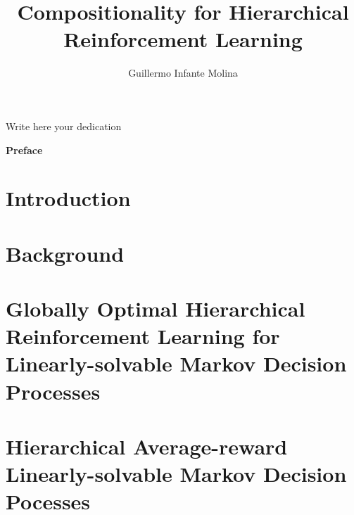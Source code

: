 \documentclass[12pt, a4paper,twoside]{tesi_upf}
\title{Compositionality for Hierarchical Reinforcement Learning}
\subtitle{}
\author{Guillermo Infante Molina}
\begin{document}
\frontmatter

\maketitle

\cleardoublepage



\noindent Write here your dedication

\cleardoublepage




\cleardoublepage


% 

\cleardoublepage

{\bf Preface}

\cleardoublepage


\tableofcontents

\listoffigures

\listoftables

\setlength{\parskip}{0.5\baselineskip}
\setlength{\parindent}{0pt}
\raggedbottom
\mainmatter

\chapter{Introduction}


\chapter{Background}


\chapter{Globally Optimal Hierarchical Reinforcement Learning for Linearly-solvable Markov Decision Processes}

\chapter{Hierarchical Average-reward Linearly-solvable Markov Decision Pocesses}

\end{document}
